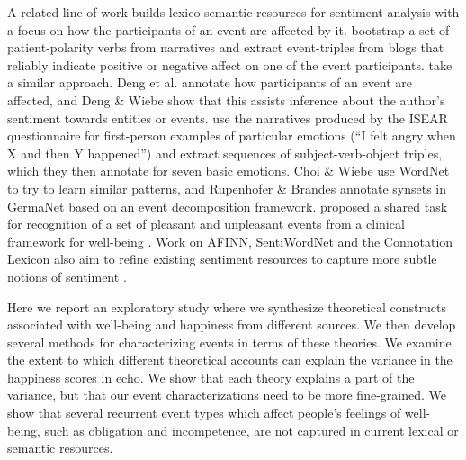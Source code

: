 \documentclass[11pt,letterpaper]{article}
\begin{document}
A related line of work builds lexico-semantic resources for sentiment
analysis with a focus on how the participants of an event are affected
by it.  bootstrap a set of patient-polarity
verbs from narratives and  extract event-triples
from blogs that reliably indicate positive or negative affect on one
of the event participants.  take a similar
approach.  Deng et al.  annotate how
participants of an event are affected, and Deng \& Wiebe
 show that this assists inference about the
author's sentiment towards entities or events. 
use the narratives produced by the ISEAR questionnaire
\cite{SchererWallbott86} for first-person examples of particular
emotions (``I felt angry when X and then Y happened'') and extract
sequences of subject-verb-object triples, which they then annotate for
seven basic emotions.  Choi \& Wiebe  use
WordNet to try to learn similar patterns, and Rupenhofer \& Brandes
 annotate synsets in GermaNet based on
an event decomposition framework.
 proposed a shared
task for recognition of a set of pleasant and unpleasant events from a
clinical framework for well-being \cite{macphillamy1982pleasant}.
Work on AFINN, SentiWordNet and the Connotation Lexicon also aim to
refine existing sentiment resources to capture more subtle notions of
sentiment
\cite{Fengetal13,Kangetal14,baccianella2010sentiwordnet,nielsen2011new}.

Here we report an exploratory study where we
synthesize theoretical constructs associated with well-being and
happiness from different sources.  We then develop several methods for
characterizing events in terms of these theories. We examine the
extent to which different theoretical accounts can explain the
variance in the happiness scores in {\sc echo}.  We show that each
theory explains a part of the variance, but that our event
characterizations need to be more fine-grained.  We show that several
recurrent event types which affect people's feelings of well-being,
such as {\sc obligation} and {\sc incompetence}, are not captured in
current lexical or semantic resources.
\end{document}
